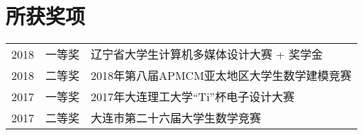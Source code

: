 \documentclass[]{deedy-resume-openfont}
\begin{document}
\begin{minipage}[t]{0.73\textwidth}

\section{所获奖项} 
\begin{tabular}{rll}
2018	     & 一等奖  & 辽宁省大学生计算机多媒体设计大赛 + 奖学金 \\
2018         & 二等奖  & 2018年第八届APMCM亚太地区大学生数学建模竞赛 \\
2017	     & 一等奖  & 2017年大连理工大学“Ti”杯电子设计大赛 \\
2017	     & 二等奖  & 大连市第二十六届大学生数学竞赛 \\
\end{tabular}
\sectionsep


% 
% 

\end{minipage} 
\end{document}
